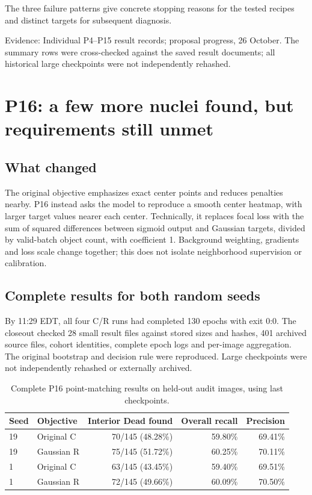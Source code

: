 \documentclass[11pt,a4paper]{article}
\newcommand{\src}[1]{\par{\footnotesize\color{gray}Evidence: #1}\par}
\begin{document}
The three failure patterns give concrete stopping reasons for the tested recipes and distinct targets for subsequent diagnosis.

\src{Individual P4--P15 result records; proposal progress, 26 October. The summary rows were cross-checked against the saved result documents; all historical large checkpoints were not independently rehashed.}

\section{P16: a few more nuclei found, but requirements still unmet}

\subsection{What changed}

The original objective emphasizes exact center points and reduces penalties nearby. P16 instead asks the model to reproduce a smooth center heatmap, with larger target values nearer each center. Technically, it replaces focal loss with the sum of squared differences between sigmoid output and Gaussian targets, divided by valid-batch object count, with coefficient 1. Background weighting, gradients and loss scale change together; this does not isolate neighborhood supervision or calibration.

\subsection{Complete results for both random seeds}

By 11:29 EDT, all four C/R runs had completed 130 epochs with exit 0:0. The closeout checked 28 small result files against stored sizes and hashes, 401 archived source files, cohort identities, complete epoch logs and per-image aggregation. The original bootstrap and decision rule were reproduced. Large checkpoints were not independently rehashed or externally archived.

\begin{table}[H]\centering\small
\begin{tabular}{llrrr}\toprule
Seed & Objective & Interior Dead found & Overall recall & Precision\\\midrule
19 & Original C & 70/145 (48.28\%) & 59.80\% & 69.41\%\\
19 & Gaussian R & 75/145 (51.72\%) & 60.25\% & 70.11\%\\
1 & Original C & 63/145 (43.45\%) & 59.40\% & 69.51\%\\
1 & Gaussian R & 72/145 (49.66\%) & 60.09\% & 70.50\%\\\bottomrule
\end{tabular}
\caption{Complete P16 point-matching results on held-out audit images, using last checkpoints.}
\end{table}
\end{document}
